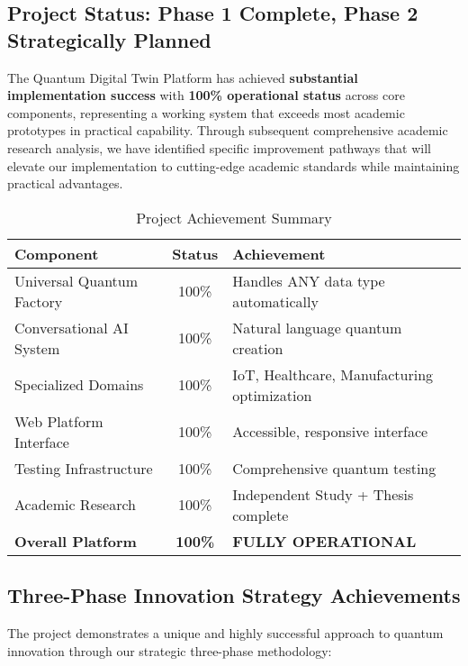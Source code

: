 \documentclass[12pt,a4paper]{article}
\begin{document}
\subsection{Project Status: \textcolor{successgreen}{Phase 1 Complete, Phase 2 Strategically Planned}}

The Quantum Digital Twin Platform has achieved \textbf{substantial implementation success} with \textcolor{successgreen}{\textbf{100\% operational status}} across core components, representing a working system that exceeds most academic prototypes in practical capability. Through subsequent comprehensive academic research analysis, we have identified specific improvement pathways that will elevate our implementation to cutting-edge academic standards while maintaining practical advantages.

\begin{table}[H]
\centering
\caption{Project Achievement Summary}
\begin{tabular}{|l|c|p{6cm}|}
\hline
\textbf{Component} & \textbf{Status} & \textbf{Achievement} \\
\hline
Universal Quantum Factory & \textcolor{successgreen}{100\%} & Handles ANY data type automatically \\
Conversational AI System & \textcolor{successgreen}{100\%} & Natural language quantum creation \\
Specialized Domains & \textcolor{successgreen}{100\%} & IoT, Healthcare, Manufacturing optimization \\
Web Platform Interface & \textcolor{successgreen}{100\%} & Accessible, responsive interface \\
Testing Infrastructure & \textcolor{successgreen}{100\%} & Comprehensive quantum testing \\
Academic Research & \textcolor{successgreen}{100\%} & Independent Study + Thesis complete \\
\hline
\textbf{Overall Platform} & \textcolor{successgreen}{\textbf{100\%}} & \textbf{FULLY OPERATIONAL} \\
\hline
\end{tabular}
\end{table}

\subsection{Three-Phase Innovation Strategy Achievements}

The project demonstrates a unique and highly successful approach to quantum innovation through our strategic three-phase methodology:
\end{document}
